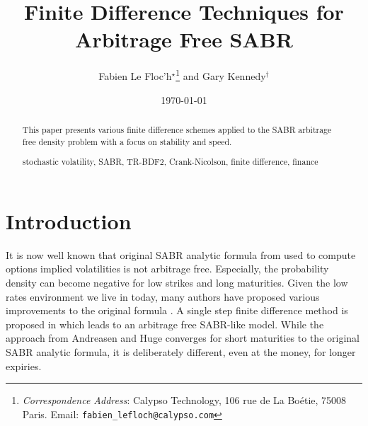 \documentclass[]{rAMF2e}
\begin{document}
\doi{}
\issn{}  \issnp{}
\def\jobtag{}
\jname{}


\title{Finite Difference Techniques for Arbitrage Free SABR}
\author{Fabien {Le Floc'h}$^\star$\thanks{{\em{Correspondence Address}}: Calypso Technology, 106 rue de La Bo\'{e}tie, 75008 Paris. Email: \texttt{fabien\_lefloch@calypso.com} \vspace{6pt}} and Gary Kennedy$^\dag$}
%
\date{\today}

\maketitle
\newcommand{\sgn}{\mathop{\mathrm{sgn}}}
\begin{abstract}
This paper presents various finite difference schemes applied to the SABR arbitrage free density problem with a focus on stability and speed.
\begin{keywords}stochastic volatility, SABR, TR-BDF2, Crank-Nicolson, finite difference, finance\end{keywords}
\end{abstract}

\section{Introduction}
It is now well known that original SABR analytic formula from \citep{hagan2002managing} used to compute options implied volatilities is not arbitrage free. Especially, the probability density can become negative for low strikes and long maturities. Given the low rates environment we live in today, many authors have proposed various improvements to the original formula \citep{obloj2007fine, johnson2009arbitrage, paulot2009asymptotic, benaim2008arbitrage}.  A single step finite difference method is proposed in \citep{andreasen2011zabr} which leads to an arbitrage free SABR-like model. While the approach from Andreasen and Huge converges for short maturities to the original SABR analytic formula, it is deliberately different, even at the money, for longer expiries.
\end{document}
